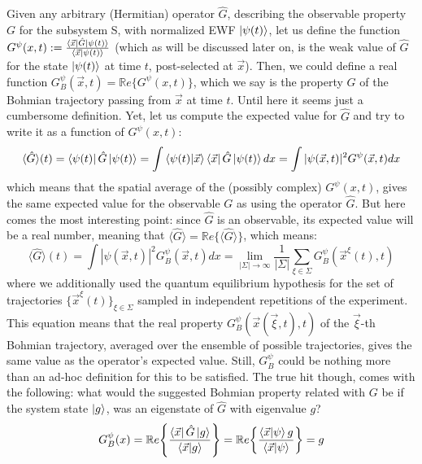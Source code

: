 \documentclass[11pt, a4paper]{article} %
\begin{document}
Given any arbitrary (Hermitian) operator $\hat{G}$, describing the observable property $G$ for the subsystem S, with normalized EWF $\ket{\psi(t)}$, let us define the function $G^{\psi}(x,t):=\frac{\bra{\vec{x}}\hat{G}\ket{\psi(t)}}{\bra{\vec{x}}\ket{\psi(t)}}$ (which as will be discussed later on, is the weak value \cite{Weak} of $\hat{G}$ for the state $\ket{\psi(t)}$ at time $t$, post-selected at $\vec{x}$). Then, we could define a real function $G_B^\psi(\vec{x},t)=\mathbb{R}e\{G^{\psi}(x,t)\}$, which we say is the property $G$ of the Bohmian trajectory passing from $\vec{x}$ at time $t$. Until here it seems just a cumbersome definition. Yet, let us compute the expected value for $\hat{G}$ and try to write it as a function of $G^\psi(x,t)$:
\begin{equation}
\langle \hat{G}\rangle(t)= \bra{\psi(t)}\hat{G}\ket{\psi(t)}=\int \bra{\psi(t)} \ket{\vec{x}}\bra{\vec{x}}\hat{G}\ket{\psi(t)}dx =  \int |\psi(\vec{x},t)|^2G^\psi(\vec{x},t)dx
\end{equation}
which means that the spatial average of the (possibly complex) $G^\psi(x,t)$, gives the same expected value for the observable $G$ as using the operator $\hat{G}$. But here comes the most interesting point: since $\hat{G}$ is an observable, its expected value will be a real number, meaning that $\langle \hat{G}\rangle=\mathbb{R}e\{\langle \hat{G}\rangle\}$, which means:
\begin{equation}
\langle \hat{G}\rangle(t)=\int |\psi(\vec{x},t)|^2G_B^\psi(\vec{x},t)dx= \lim_{|\Sigma|\rightarrow \infty}\frac{1}{|\Sigma|} \sum_{\xi\in\Sigma} G_B^\psi(\vec{x}^\xi(t),t)
\end{equation}
where we additionally used the quantum equilibrium hypothesis \cite{Absolute} for the set of trajectories $\{\vec{x}^\xi(t)\}_{\xi\in\Sigma}$ sampled in independent repetitions of the experiment. This equation means that the real property $G_B^\psi(\vec{x}(\vec{\xi},t),t)$ of the $\vec{\xi}$-th Bohmian trajectory, averaged over the ensemble of possible trajectories, gives the same value as the operator's expected value. Still, $G^\psi_B$ could be nothing more than an ad-hoc definition for this to be satisfied. The true hit though, comes with the following: what would the suggested Bohmian property related with $G$ be if the system state $\ket{g}$, was an eigenstate of $\hat{G}$ with eigenvalue $g$?
\begin{equation}
G_B^\psi(x)=\mathbb{R}e\qty{ \frac{\bra{\vec{x}}\hat{G}\ket{g}}{\bra{\vec{x}}\ket{g}} } = \mathbb{R}e\qty{ \frac{\bra{\vec{x}}\ket{\psi}g}{\bra{\vec{x}}\ket{\psi}} }=g
\end{equation}
\end{document}

